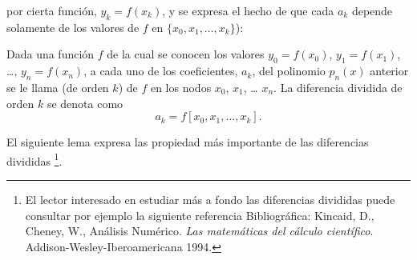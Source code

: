 por cierta función, $y_k=f(x_k)$, y se expresa el hecho de que cada
$a_k$ depende solamente de los valores de $f$ en
$\{x_0,x_1,\dots,x_k\}$):
\begin{definition}
  Dada una función $f$ de la cual se conocen los valores $y_0=f(x_0)$,
  $y_1=f(x_1)$, \dots, $y_n=f(x_n)$, 
  a cada uno de los coeficientes, $a_k$, del polinomio $p_n(x)$
  anterior se le llama  (de orden $k$) de $f$ en los nodos $x_0$, $x_1$, \dots
  $x_n$. La diferencia dividida de orden $k$ se denota como
  $$
  a_k = f[x_0,x_1,\dots,x_k].
  $$
\end{definition}

El siguiente lema expresa las propiedad más importante de las
diferencias divididas%
\footnote{El lector interesado en estudiar más a fondo las
  diferencias divididas  puede consultar por ejemplo la
  siguiente referencia Bibliográfica: Kincaid, D., Cheney, W.,
  Análisis Numérico. \textit{Las matemáticas del cálculo
    científico}. Addison-Wesley-Iberoamericana 1994.}.


   
